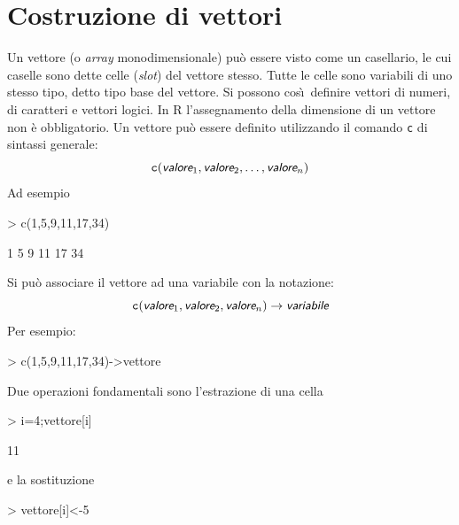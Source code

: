 \documentclass[onecolumn,11pt]{book}
\newcommand{\varia}[1]{\textsl{\textsf{#1}}}
\begin{document}
\section{Costruzione di vettori}  Un vettore (o \textit{array} monodimensionale)
pu\`o essere visto come un casellario, le cui caselle sono dette celle (\emph{slot}) del vettore stesso. Tutte le celle sono variabili di uno stesso tipo, detto tipo base del vettore. Si possono cos\`\i\  definire vettori di numeri, di caratteri e vettori logici.
In \textsf{R} l'assegnamento della dimensione di un vettore non \`e obbligatorio. %
Un vettore pu\`o  essere definito utilizzando il comando \texttt{c} di sintassi generale:
\begin{equation*}
\texttt{c}(\varia{valore}_1, \varia{valore}_2, \ldots,\varia{valore}_n)
\end{equation*}
Ad esempio
\begin{Schunk}
\begin{Sinput}
>  c(1,5,9,11,17,34)
\end{Sinput}
\begin{Soutput}
[1]  1  5  9 11 17 34
\end{Soutput}
\end{Schunk}
Si pu\`o associare il vettore ad una variabile con la notazione:
\begin{equation*}
\texttt{c}(\varia{valore}_1, \varia{valore}_2, \varia{valore}_n)\rightarrow \varia{variabile}
\end{equation*}
Per esempio:
\begin{Schunk}
\begin{Sinput}
> c(1,5,9,11,17,34)->vettore
\end{Sinput}
\end{Schunk}
Due operazioni fondamentali sono l'estrazione di una cella
\begin{Schunk}
\begin{Sinput}
> i=4;vettore[i]
\end{Sinput}
\begin{Soutput}
[1] 11
\end{Soutput}
\end{Schunk}
e la sostituzione
\begin{Schunk}
\begin{Sinput}
> vettore[i]<-5
\end{Sinput}
\end{Schunk}
\end{document}
